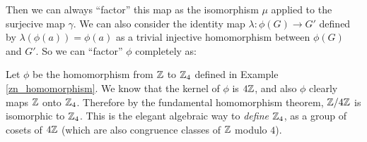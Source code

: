 \begin{center}
\end{center}

Then we can always ``factor'' this map as the isomorphism $\mu$ applied to the surjecive map $\gamma$. We can also consider the identity map $\lambda: \phi(G) \to G'$ defined by $\lambda(\phi(a)) = \phi(a)$ as a trivial injective homomorphism between $\phi(G)$ and $G'$. So we can ``factor'' $\phi$ completely as:

\begin{center}
\end{center}

\begin{example}
Let $\phi$ be the homomorphism from $\z$ to $\zn[4]$ defined in Example \ref{zn_homomorphism}. We know that the kernel of $\phi$ is $4\z$, and also $\phi$ clearly maps $\z$ onto $\zn[4]$. Therefore by the fundamental homomorphism theorem, $\z/4\z$ is isomorphic to $\zn[4]$. This is the elegant algebraic way to \textit{define} $\zn[4]$, as a group of cosets of $4\z$ (which are also congruence classes of $\z$ modulo $4$).
\end{example}

